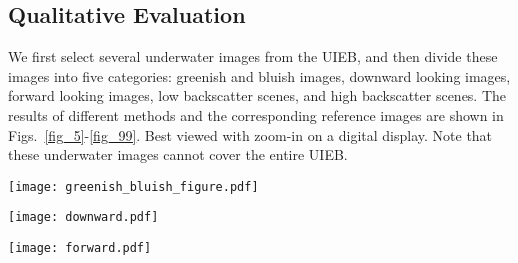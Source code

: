 \documentclass[journal]{IEEEtran}
\begin{document}
\subsection{Qualitative Evaluation}

We first select several underwater images from the UIEB, and then divide these images into five categories: greenish and bluish images, downward looking images, forward looking images, low backscatter scenes, and high backscatter scenes. The results of different methods and the corresponding reference images are shown in Figs.~\ref{fig_5}-\ref{fig_99}. Best viewed with zoom-in on a digital display. Note that these underwater images cannot cover the entire UIEB.




\begin{figure*}[!htb]
\centering
\texttt{[image: greenish\_bluish\_figure.pdf]}
\caption{Subjective comparisons on bluish and greenish  underwater images. From left to right are raw underwater images, and the results of fusion-based \cite{Ancuti2012}, retinex-based \cite{Fu2014}, two-step-based \cite{Fu2017}, UDCP \cite{Drews2016}, Red Channel \cite{Galdran2015}, histogram prior~\cite{Li2016}, regression-based~\cite{Li2017prl}, blurriness-based~\cite{Peng2017}, GDCP~\cite{Peng2018}, and reference images.}
\label{fig_5}
\end{figure*}

\begin{figure*}[!htb]
\centering
\texttt{[image: downward.pdf]}
\caption{Subjective comparisons on downward looking images. From left to right are raw underwater images, and the results of fusion-based \cite{Ancuti2012}, retinex-based \cite{Fu2014}, two-step-based \cite{Fu2017}, UDCP \cite{Drews2016}, Red Channel \cite{Galdran2015}, histogram prior~\cite{Li2016}, regression-based~\cite{Li2017prl}, blurriness-based~\cite{Peng2017}, GDCP~\cite{Peng2018}, and reference images.}
\label{fig_6}
\end{figure*}

\begin{figure*}[!htb]
\centering
\texttt{[image: forward.pdf]}
\caption{Subjective comparisons on forward looking images. From left to right are raw underwater images, and the results of fusion-based \cite{Ancuti2012}, retinex-based \cite{Fu2014}, two-step-based \cite{Fu2017}, UDCP \cite{Drews2016}, Red Channel \cite{Galdran2015}, histogram prior~\cite{Li2016}, regression-based~\cite{Li2017prl}, blurriness-based~\cite{Peng2017}, GDCP~\cite{Peng2018}, and reference images.}
\label{fig_7}
\end{figure*}
\end{document}
